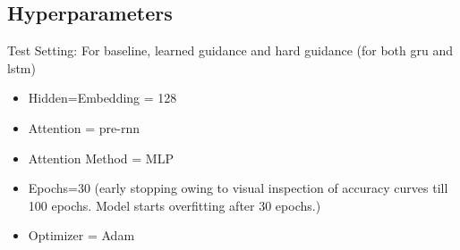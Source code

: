 \subsection{Hyperparameters}
Test Setting: For baseline, learned guidance and hard guidance (for both gru and lstm)
 \begin{itemize}
 	\item Hidden=Embedding = 128
 	\item Attention = pre-rnn
 	\item Attention Method = MLP
 	\item Epochs=30 (early stopping owing to visual inspection of accuracy curves till 100 epochs. Model starts overfitting after 30 epochs.)
 	\item Optimizer = Adam
 \end{itemize}